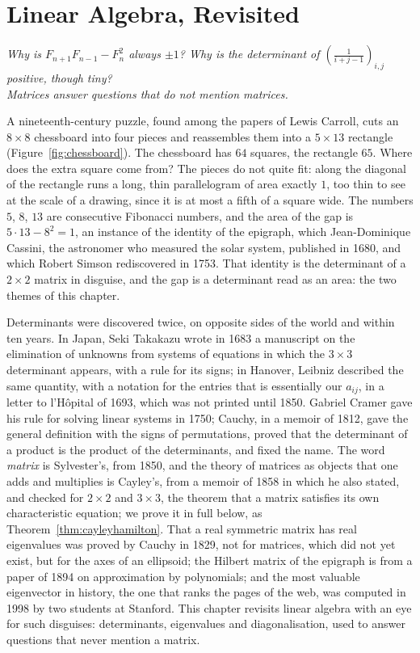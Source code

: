 \chapter{Linear Algebra, Revisited}

\begin{center}\itshape
Why is $F_{n+1}F_{n-1}-F_n^2$ always $\pm1$? Why is the determinant of $\left(\frac1{i+j-1}\right)_{i,j}$ positive, though tiny?\\
Matrices answer questions that do not mention matrices.
\end{center}

A nineteenth-century puzzle, found among the papers of Lewis Carroll, cuts an $8\times8$ chessboard into four pieces and reassembles them into a
$5\times13$ rectangle (Figure~\ref{fig:chessboard}). The chessboard has $64$ squares, the rectangle $65$. Where does the extra square come from? The
pieces do not quite fit: along the diagonal of the rectangle runs a long, thin parallelogram of area exactly $1$, too thin to see at the scale of a
drawing, since it is at most a fifth of a square wide. The numbers $5$, $8$, $13$ are consecutive Fibonacci numbers, and the area of the gap is
$5\cdot13-8^2=1$, an instance of the identity of the epigraph, which Jean-Dominique Cassini, the astronomer who measured the solar system, published in
1680, and which Robert Simson rediscovered in 1753. That identity is the determinant of a $2\times2$ matrix in disguise, and the gap is a determinant
read as an area: the two themes of this chapter.

Determinants were discovered twice, on opposite sides of the world and within ten years. In Japan, Seki Takakazu wrote in 1683 a manuscript on the
elimination of unknowns from systems of equations in which the $3\times3$ determinant appears, with a rule for its signs; in Hanover, Leibniz
described the same quantity, with a notation for the entries that is essentially our $a_{ij}$, in a letter to l'H\^opital of 1693, which was not
printed until 1850. Gabriel Cramer gave his rule for solving linear systems in 1750; Cauchy, in a memoir of 1812, gave the general definition with the
signs of permutations, proved that the determinant of a product is the product of the determinants, and fixed the name. The word \emph{matrix} is
Sylvester's, from 1850, and the theory of matrices as objects that one adds and multiplies is Cayley's, from a memoir of 1858 in which he also stated,
and checked for $2\times2$ and $3\times3$, the theorem that a matrix satisfies its own characteristic equation; we prove it in full below, as
Theorem~\ref{thm:cayleyhamilton}. That a real symmetric matrix has real eigenvalues was proved by Cauchy in 1829, not for matrices, which did not yet
exist, but for the axes of an ellipsoid; the Hilbert matrix of the epigraph is from a paper of 1894 on approximation by polynomials; and the most
valuable eigenvector in history, the one that ranks the pages of the web, was computed in 1998 by two students at Stanford. This chapter revisits
linear algebra with an eye for such disguises: determinants, eigenvalues and diagonalisation, used to answer questions that never mention a matrix.

